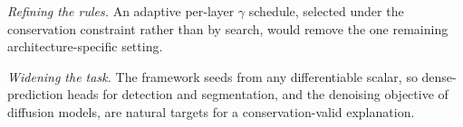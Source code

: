 \documentclass[lettersize,journal]{IEEEtran}
\theoremstyle{definition}
\theoremstyle{plain}
\begin{document}
\emph{Refining the rules.} An adaptive per-layer $\gamma$ schedule, selected under the conservation constraint rather than by search, would remove the one remaining architecture-specific setting.

\emph{Widening the task.} The framework seeds from any differentiable scalar, so dense-prediction heads for detection and segmentation, and the denoising objective of diffusion models, are natural targets for a conservation-valid explanation.




\vfill
\end{document}
